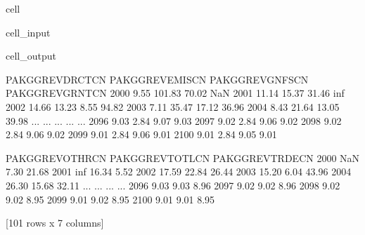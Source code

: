 \documentclass[letterpaper,10pt,english]{jupyterBook}
\begin{document}
\begin{sphinxuseclass}{cell}\begin{sphinxVerbatimInput}

\begin{sphinxuseclass}{cell_input}
\begin{sphinxVerbatim}[commandchars=\\\{\}]
\PYG{p}{[}\PYG{p}{]}
\end{sphinxVerbatim}

\end{sphinxuseclass}\end{sphinxVerbatimInput}
\begin{sphinxVerbatimOutput}

\begin{sphinxuseclass}{cell_output}
\begin{sphinxVerbatim}[commandchars=\\\{\}]
      PAKGGREVDRCTCN  PAKGGREVEMISCN  PAKGGREVGNFSCN  PAKGGREVGRNTCN   
2000            9.55          101.83           70.02             NaN  \PYGZbs{}
2001           11.14           15.37           31.46             inf   
2002           14.66          \PYGZhy{}13.23            8.55           94.82   
2003            7.11           35.47           17.12          \PYGZhy{}36.96   
2004            8.43           21.64           13.05          \PYGZhy{}39.98   
...              ...             ...             ...             ...   
2096            9.03            2.84            9.07            9.03   
2097            9.02            2.84            9.06            9.02   
2098            9.02            2.84            9.06            9.02   
2099            9.01            2.84            9.06            9.01   
2100            9.01            2.84            9.05            9.01   

      PAKGGREVOTHRCN  PAKGGREVTOTLCN  PAKGGREVTRDECN  
2000             NaN            7.30          \PYGZhy{}21.68  
2001             inf           16.34            5.52  
2002           17.59           22.84          \PYGZhy{}26.44  
2003           15.20            6.04           43.96  
2004           26.30           15.68           32.11  
...              ...             ...             ...  
2096            9.03            9.03            8.96  
2097            9.02            9.02            8.96  
2098            9.02            9.02            8.95  
2099            9.01            9.02            8.95  
2100            9.01            9.01            8.95  

[101 rows x 7 columns]
\end{sphinxVerbatim}

\end{sphinxuseclass}\end{sphinxVerbatimOutput}

\end{sphinxuseclass}
\end{document}
